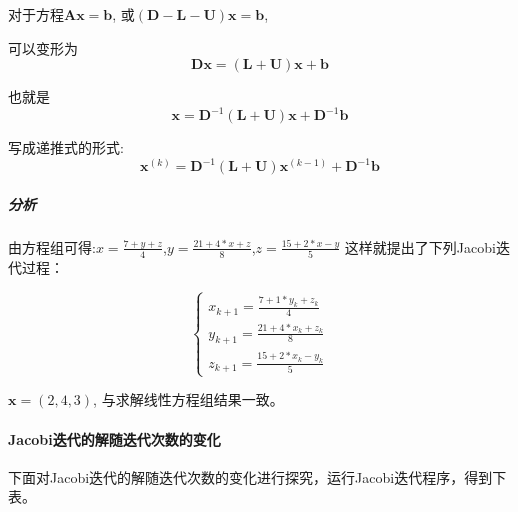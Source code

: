 对于方程$\mathbf{A} \mathbf{x} = \mathbf{b}$, 或$\left(\mathbf{D} - \mathbf{L} - \mathbf{U} \right) \mathbf{x} = \mathbf{b}$, 

可以变形为$$\mathbf{D} \mathbf{x} = \left(\mathbf{L} + \mathbf{U} \right) \mathbf{x} + \mathbf{b}$$

也就是$$\mathbf{x} = \mathbf{D}^{-1} \left(\mathbf{L} + \mathbf{U}\right) \mathbf{x} + \mathbf{D}^{-1}\mathbf{b}$$

写成递推式的形式: $$\mathbf{x}^{\left(k\right)} = \mathbf{D}^{-1} \left(\mathbf{L} + \mathbf{U}\right) \mathbf{x}^{\left(k-1\right)} + \mathbf{D}^{-1}\mathbf{b}$$

\subparagraph{分析}
由方程组可得:$x=\frac{7+y+z}{4}$,$y=\frac{21+4*x+z}{8}$,$z=\frac{15+2*x-y}{5}$
这样就提出了下列Jacobi迭代过程：

$$ \left\{
\begin{aligned}
x_{k+1} =\frac{7+1*y_k+z_k}{4} \\
y_{k+1} =\frac{21+4 * x_k+z_k}{8} \\
z_{k+1} =\frac{15+2*x_k-y_k}{5}
\end{aligned}
\right.
$$

$\mathbf{x} = \left(2,4,3\right)$, 与求解线性方程组结果一致。

\paragraph{Jacobi迭代的解随迭代次数的变化}

下面对Jacobi迭代的解随迭代次数的变化进行探究，运行Jacobi迭代程序，得到下表。

